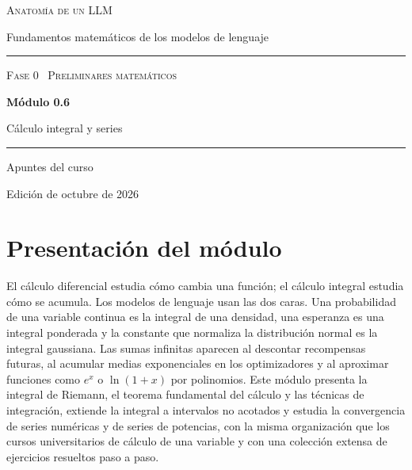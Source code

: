 \documentclass[11pt,a4paper,twoside,openany]{book}
\begin{document}
\frontmatter
\begin{titlepage}
\centering
\vspace*{2.5cm}
{\large\scshape Anatomía de un LLM}\par
\vspace{0.4cm}
{\normalsize Fundamentos matemáticos de los modelos de lenguaje}\par
\vspace{2.2cm}
\rule{\textwidth}{0.8pt}\par\vspace{0.5cm}
{\small\scshape Fase 0 \textperiodcentered\ Preliminares matemáticos}\par\vspace{0.3cm}
{\Huge\bfseries Módulo 0.6\par}\vspace{0.3cm}
{\LARGE Cálculo integral y series\par}
\vspace{0.5cm}\rule{\textwidth}{0.4pt}\par
\vspace{1.6cm}
{\large Apuntes del curso}\par
\vfill
{\small Edición de octubre de 2026}\par
\end{titlepage}

\chapter*{Presentación del módulo}

El cálculo diferencial estudia cómo cambia una función; el cálculo integral estudia cómo se acumula. Los modelos de lenguaje usan las dos caras. Una probabilidad de una variable continua es la integral de una densidad, una esperanza es una integral ponderada y la constante que normaliza la distribución normal es la integral gaussiana. Las sumas infinitas aparecen al descontar recompensas futuras, al acumular medias exponenciales en los optimizadores y al aproximar funciones como $e^{x}$ o $\ln(1+x)$ por polinomios. Este módulo presenta la integral de Riemann, el teorema fundamental del cálculo y las técnicas de integración, extiende la integral a intervalos no acotados y estudia la convergencia de series numéricas y de series de potencias, con la misma organización que los cursos universitarios de cálculo de una variable y con una colección extensa de ejercicios resueltos paso a paso.
\end{document}
